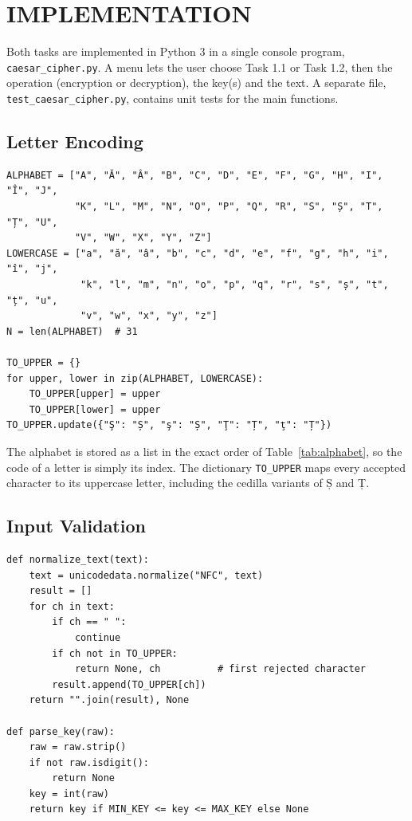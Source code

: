 \documentclass[12pt,a4paper]{article}
\begin{document}
\section{IMPLEMENTATION}

Both tasks are implemented in Python 3 in a single console program,
\texttt{caesar\_cipher.py}. A menu lets the user choose Task 1.1 or Task 1.2, then the
operation (encryption or decryption), the key(s) and the text. A separate file,
\texttt{test\_caesar\_cipher.py}, contains unit tests for the main functions.

\subsection{Letter Encoding}

\begin{lstlisting}[caption={Romanian alphabet and letter normalization}]
ALPHABET = ["A", "Ă", "Â", "B", "C", "D", "E", "F", "G", "H", "I", "Î", "J",
            "K", "L", "M", "N", "O", "P", "Q", "R", "S", "Ș", "T", "Ț", "U",
            "V", "W", "X", "Y", "Z"]
LOWERCASE = ["a", "ă", "â", "b", "c", "d", "e", "f", "g", "h", "i", "î", "j",
             "k", "l", "m", "n", "o", "p", "q", "r", "s", "ș", "t", "ț", "u",
             "v", "w", "x", "y", "z"]
N = len(ALPHABET)  # 31

TO_UPPER = {}
for upper, lower in zip(ALPHABET, LOWERCASE):
    TO_UPPER[upper] = upper
    TO_UPPER[lower] = upper
TO_UPPER.update({"Ş": "Ș", "ş": "Ș", "Ţ": "Ț", "ţ": "Ț"})
\end{lstlisting}

The alphabet is stored as a list in the exact order of Table~\ref{tab:alphabet}, so the
code of a letter is simply its index. The dictionary \texttt{TO\_UPPER} maps every accepted
character to its uppercase letter, including the cedilla variants of Ș and Ț.

\subsection{Input Validation}

\begin{lstlisting}[caption={Text normalization and key validation}]
def normalize_text(text):
    text = unicodedata.normalize("NFC", text)
    result = []
    for ch in text:
        if ch == " ":
            continue
        if ch not in TO_UPPER:
            return None, ch          # first rejected character
        result.append(TO_UPPER[ch])
    return "".join(result), None

def parse_key(raw):
    raw = raw.strip()
    if not raw.isdigit():
        return None
    key = int(raw)
    return key if MIN_KEY <= key <= MAX_KEY else None
\end{lstlisting}
\end{document}
